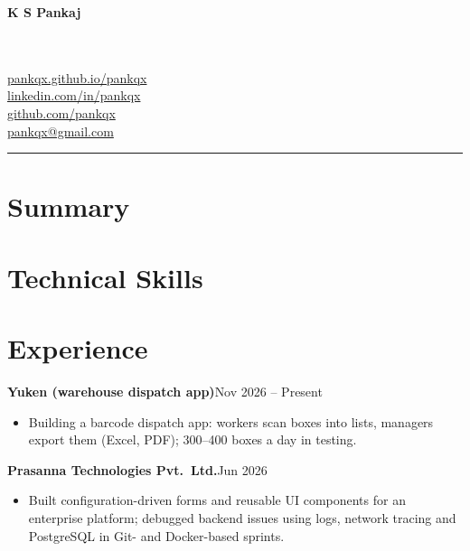 \documentclass[a4paper,10pt]{article}
\newenvironment{bullets}{\begin{itemize}[leftmargin=1.2em, itemsep=1pt, topsep=1.5pt, partopsep=0pt, parsep=0pt]}{\end{itemize}\vspace{1pt}}
\newcommand{\job}[4]{\textbf{#1}\hfill{\small #2}\\[-1pt]\hspace*{0.8em}{\small\itshape #3}\hfill{\small #4}\vspace{1pt}}
\begin{document}
\noindent
\begin{minipage}[b]{0.55\textwidth}
  \raggedright
  {\sffamily\bfseries\fontsize{30}{32}\selectfont K S Pankaj}\\[8pt]
  {\large \roleName}\\[1pt]
  \small \roleLine\\
\end{minipage}%
\begin{minipage}[b]{0.45\textwidth}
  \raggedleft
  \href{https://pankqx.github.io/pankqx}{pankqx.github.io/pankqx}\\[1pt]
  \href{https://linkedin.com/in/pankqx}{linkedin.com/in/pankqx}\\[1pt]
  \href{https://github.com/pankqx}{github.com/pankqx}\\[1pt]
  \href{mailto:pankqx@gmail.com}{pankqx@gmail.com}
\end{minipage}
\vspace{3pt}
\hrule

\section*{Summary}
\roleSummary

\section*{Technical Skills}
\roleSkills

\section*{Experience}
\job{Yuken (warehouse dispatch app)}{Nov 2026 -- Present}{Freelance Software Developer}{}
\begin{bullets}
  \item Building a barcode dispatch app: workers scan boxes into lists, managers export them (Excel, PDF); 300--400 boxes a day in testing.
\end{bullets}

\job{Prasanna Technologies Pvt.\ Ltd.}{Jun 2026}{Software Developer Intern}{}
\begin{bullets}
  \item Built configuration-driven forms and reusable UI components for an enterprise platform; debugged backend issues using logs, network tracing and PostgreSQL in Git- and Docker-based sprints.
\end{bullets}
\end{document}
